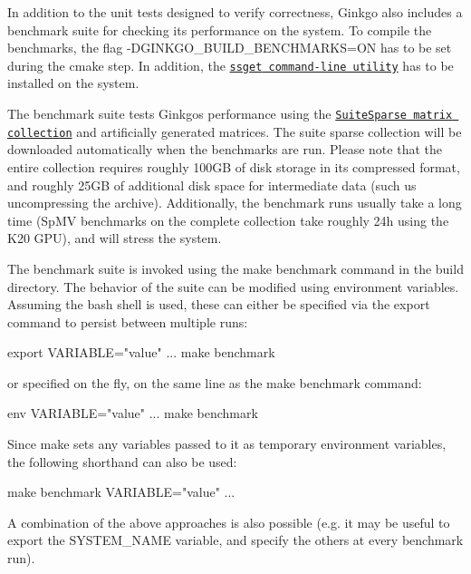 In addition to the unit tests designed to verify correctness, Ginkgo also includes a benchmark suite for checking its performance on the system. To compile the benchmarks, the flag {\ttfamily -\/\+D\+G\+I\+N\+K\+G\+O\+\_\+\+B\+U\+I\+L\+D\+\_\+\+B\+E\+N\+C\+H\+M\+A\+R\+KS=ON} has to be set during the {\ttfamily cmake} step. In addition, the \href{https://github.com/ginkgo-project/ssget}{\tt {\ttfamily ssget} command-\/line utility} has to be installed on the system.

The benchmark suite tests Ginkgo\textquotesingle{}s performance using the \href{https://sparse.tamu.edu/}{\tt Suite\+Sparse matrix collection} and artificially generated matrices. The suite sparse collection will be downloaded automatically when the benchmarks are run. Please note that the entire collection requires roughly 100\+GB of disk storage in its compressed format, and roughly 25\+GB of additional disk space for intermediate data (such us uncompressing the archive). Additionally, the benchmark runs usually take a long time (Sp\+MV benchmarks on the complete collection take roughly 24h using the K20 G\+PU), and will stress the system.

The benchmark suite is invoked using the {\ttfamily make benchmark} command in the build directory. The behavior of the suite can be modified using environment variables. Assuming the {\ttfamily bash} shell is used, these can either be specified via the {\ttfamily export} command to persist between multiple runs\+:


\begin{DoxyCode}
export VARIABLE="value"
...
make benchmark
\end{DoxyCode}


or specified on the fly, on the same line as the {\ttfamily make benchmark} command\+:


\begin{DoxyCode}
env VARIABLE="value" ... make benchmark
\end{DoxyCode}


Since {\ttfamily make} sets any variables passed to it as temporary environment variables, the following shorthand can also be used\+:


\begin{DoxyCode}
make benchmark VARIABLE="value" ...
\end{DoxyCode}


A combination of the above approaches is also possible (e.\+g. it may be useful to {\ttfamily export} the {\ttfamily S\+Y\+S\+T\+E\+M\+\_\+\+N\+A\+ME} variable, and specify the others at every benchmark run).

